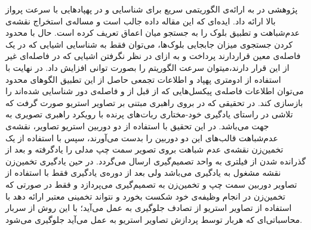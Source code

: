 پژوهشی در  به ارائه‌ی الگوریتمی سریع برای شناسایی و  در پهپادهایی با سرعت پرواز بالا ارائه داد. ایده‌ای که این مقاله داده جالب است و مساله‌ی استخراج نقشه‌ی عدم‌شباهت و تطبیق بلوک را به جستجو میان اعماق تعریف کرده است. حال با محدود کردن جستجوی میزان جابجایی بلوک‌ها، می‌توان فقط به شناسایی اشیایی که در یک فاصله‌ی معین قراردارند پرداخت و به ازای در نظر نگرفتن اشیایی که در فاصله‌ای غیر از این قرار دارند،میتوان سرعت الگوریتم را بصورت توانی افزایش داد. در نهایت با استفاده از ادومتری پهپاد و اطلاعات تجمعی حاصل از این تطبیق الگوهای محدود می‌توان اطلاعات فاصله‌ی پیکسل‌هایی که از قبل از و فاصله‌ی دور شناسایی شده‌اند را بازسازی کند.
در تحقیقی که در  بروی راهبری مبتنی بر تصاویر استریو صورت گرفت که تلاشی در راستای یادگیری خود-مختاری ربات‌های پرنده با رویکرد راهبری تصویری به جهت  می‌باشد. در این تحقیق با استفاده از دو دوربین استریو تصاویر، نقشه‌ی عدم‌شباهت قالب‌های این دو دوربین را بدست می‌آورند، سپس با استفاده از یک تخمین‌زن نقشه‌ی عدم شباهت بروی تصویر سمت چپ مدلی را یادگرفته و بعد از گذرانده شدن از فیلتری به واحد تصمیم‌گیری ارسال می‌گردد. در حین یادگیری تخمین‌‌زن نقشه مشغول به یادگیری می‌باشد ولی بعد از دوره‌ی یادگیری فقط با استفاده از تصاویر دوربین سمت چپ و تخمین‌زن به تصمیم‌گیری می‌پردازد و فقط در صورتی که تخمین‌زن در انجام وظیفه‌ی خود شکست بخورد و نتواند تخمینی معتبر ارائه دهد با استفاده از تصاویر استریو از تصادف جلوگیری به عمل می‌آید؛ با این روش از سربار محاسباتی‌ای که هربار توسط پردازش تصاویر استریو به عمل می‌آید جلوگیری می‌شود.